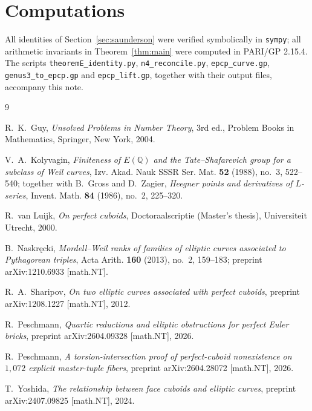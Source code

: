 \documentclass[11pt,reqno]{amsart}
\theoremstyle{plain}
\theoremstyle{definition}
\newcommand{\Q}{\mathbb{Q}}
\begin{document}
\section*{Computations}
All identities of Section~\ref{sec:saunderson} were verified symbolically in
\texttt{sympy}; all arithmetic invariants in Theorem~\ref{thm:main} were computed
in PARI/GP 2.15.4. The scripts \texttt{theoremE\_identity.py},
\texttt{n4\_reconcile.py}, \texttt{epcp\_curve.gp}, \texttt{genus3\_to\_epcp.gp}
and \texttt{epcp\_lift.gp}, together with their output files, accompany this
note.

\begin{thebibliography}{9}

R.~K.~Guy,
\emph{Unsolved Problems in Number Theory}, 3rd ed.,
Problem Books in Mathematics, Springer, New York, 2004.

V.~A.~Kolyvagin,
\emph{Finiteness of $E(\Q)$ and the Tate--Shafarevich group for a subclass
of Weil curves},
Izv. Akad. Nauk SSSR Ser. Mat. \textbf{52} (1988), no.~3, 522--540;
together with B.~Gross and D.~Zagier,
\emph{Heegner points and derivatives of $L$-series},
Invent. Math. \textbf{84} (1986), no.~2, 225--320.

R.~van Luijk,
\emph{On perfect cuboids},
Doctoraalscriptie (Master's thesis), Universiteit Utrecht, 2000.

B.~Naskr\k{e}cki,
\emph{Mordell--Weil ranks of families of elliptic curves associated to
Pythagorean triples},
Acta Arith. \textbf{160} (2013), no.~2, 159--183;
preprint arXiv:1210.6933 [math.NT].

R.~A.~Sharipov,
\emph{On two elliptic curves associated with perfect cuboids},
preprint arXiv:1208.1227 [math.NT], 2012.

R.~Peschmann,
\emph{Quartic reductions and elliptic obstructions for perfect Euler bricks},
preprint arXiv:2604.09328 [math.NT], 2026.

R.~Peschmann,
\emph{A torsion-intersection proof of perfect-cuboid nonexistence on
$1{,}072$ explicit master-tuple fibers},
preprint arXiv:2604.28072 [math.NT], 2026.

T.~Yoshida,
\emph{The relationship between face cuboids and elliptic curves},
preprint arXiv:2407.09825 [math.NT], 2024.

\end{thebibliography}
\end{document}
